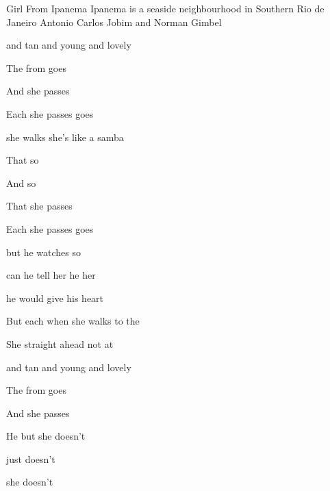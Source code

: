 \begin{SBSong}{Girl From Ipanema}
  {Ipanema is a seaside neighbourhood in Southern Rio de Janeiro}
  {Antonio Carlos Jobim and Norman Gimbel}
  \begin{SBVerse}
	 and tan and young and lovely 
	
	The  from   goes  
	
	And  she passes 
	
	Each  she passes goes   
  \end{SBVerse}
  \begin{SBVerse}
	 she walks she's like a samba 
	
	That  so 
	
	And  so  
	
	That  she passes 
	
	Each  she passes goes 
  \end{SBVerse}
  
  \begin{SBVerse}
	 but he watches so  
	
	 can he tell her he  her 
	
	 he would give his heart  
	
	But each  when she walks to the 
	
	She  straight ahead not at 
  \end{SBVerse}
  \begin{SBVerse}
	 and tan and young and lovely 
	
	The  from   goes  
	
	And  she passes 
	
	He  but she doesn't  
	
	 just doesn't 
	
	 she doesn't  
  \end{SBVerse}
\end{SBSong}
